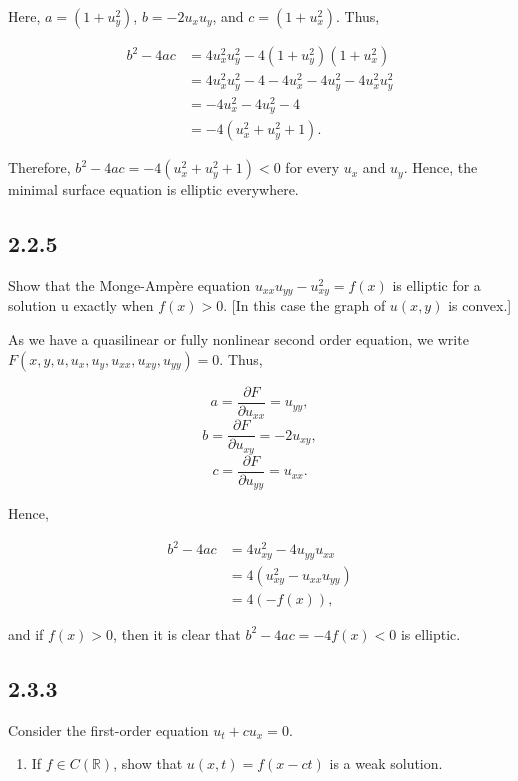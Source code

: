 \documentclass{article}
\begin{document}
\begin{flushleft}
Here, $a=(1+u_y^2)$, $b=-2u_xu_y$, and $c=(1+u_x^2)$. Thus,

\begin{equation*}
\begin{split}
b^2-4ac&=4u_x^2u_y^2-4(1+u_y^2)(1+u_x^2)\\&=4u_x^2u_y^2-4 - 4u_x^2-4u_y^2-4u_x^2u_y^2\\&=-4u_x^2-4u_y^2-4\\&=-4(u_x^2+u_y^2+1).
\end{split}
\end{equation*}

Therefore, $b^2-4ac = -4(u_x^2+u_y^2+1) < 0$ for every $u_x$ and $u_y$. Hence, the minimal surface equation is elliptic everywhere.

\subsection{\textbf{2.2.5}} Show that the Monge-Amp\`ere equation $u_{xx}u_{yy}-u_{xy}^2=f(x)$ is elliptic for a solution u exactly when $f(x)>0$. [In this case the graph of $u(x,y)$ is convex.]

As we have a quasilinear or fully nonlinear second order equation, we write $F(x,y,u,u_x,u_y,u_{xx},u_{xy},u_{yy}) = 0$. Thus,

$$a=\frac{\partial F}{\partial u_{xx}}=u_{yy},$$
$$b=\frac{\partial F}{\partial u_{xy}}=-2u_{xy},$$
$$c=\frac{\partial F}{\partial u_{yy}}=u_{xx}.$$

Hence,

\begin{equation*}
\begin{split}
b^2-4ac&=4u_{xy}^2-4u_{yy}u_{xx}\\&=4(u_{xy}^2-u_{xx}u_{yy})\\&=4(-f(x)),
\end{split}
\end{equation*}
\end{flushleft}

and if $f(x)>0$, then it is clear that $b^2-4ac = -4f(x)<0$ is elliptic.

\subsection{\textbf{2.3.3}} Consider the first-order equation $u_t+cu_x=0$.

\begin{enumerate}[label=(\alph*)]
    \item If $f\in C(\mathbb {R})$, show that $u(x,t)=f(x-ct)$ is a weak solution.
\end{enumerate}
\end{document}

